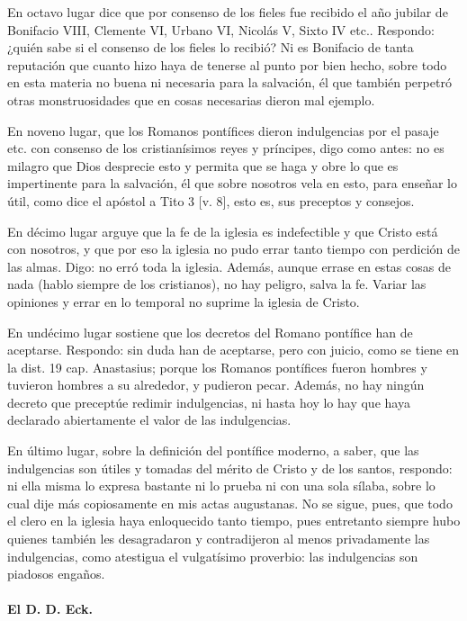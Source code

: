 En octavo lugar dice que por consenso de los fieles fue recibido el año jubilar de Bonifacio VIII, Clemente VI, Urbano VI, Nicolás V, Sixto IV etc.. Respondo: ¿quién sabe si el consenso de los fieles lo recibió? Ni es Bonifacio de tanta reputación que cuanto hizo haya de tenerse al punto por bien hecho, sobre todo en esta materia no buena ni necesaria para la salvación, él que también perpetró otras monstruosidades que en cosas necesarias dieron mal ejemplo.

En noveno lugar, que los Romanos pontífices dieron indulgencias por el pasaje etc. con consenso de los cristianísimos reyes y príncipes, digo como antes: no es milagro que Dios desprecie esto y permita que se haga y obre lo que es impertinente para la salvación, él que sobre nosotros vela en esto, para enseñar lo útil, como dice el apóstol a Tito 3 [v. 8], esto es, sus preceptos y consejos.

En décimo lugar arguye que la fe de la iglesia es indefectible y que Cristo está con nosotros, y que por eso la iglesia no pudo errar tanto tiempo con perdición de las almas. \marginpar{\small[349]} Digo: no erró toda la iglesia. Además, aunque errase en estas cosas de nada (hablo siempre de los cristianos), no hay peligro, salva la fe. Variar las opiniones y errar en lo temporal no suprime la iglesia de Cristo.

En undécimo lugar sostiene que los decretos del Romano pontífice han de aceptarse. Respondo: sin duda han de aceptarse, pero con juicio, como se tiene en la dist. 19 cap. Anastasius; porque los Romanos pontífices fueron hombres y tuvieron hombres a su alrededor, y pudieron pecar. Además, no hay ningún decreto que preceptúe redimir indulgencias, ni hasta hoy lo hay que haya declarado abiertamente el valor de las indulgencias.

En último lugar, sobre la definición del pontífice moderno, a saber, que las indulgencias son útiles y tomadas del mérito de Cristo y de los santos, respondo: ni ella misma lo expresa bastante ni lo prueba ni con una sola sílaba, sobre lo cual dije más copiosamente en mis actas augustanas. No se sigue, pues, que todo el clero en la iglesia haya enloquecido tanto tiempo, pues entretanto siempre hubo quienes también les desagradaron y contradijeron al menos privadamente las indulgencias, como atestigua el vulgatísimo proverbio: las indulgencias son piadosos engaños.

\paragraph*{El D. D. Eck.}

